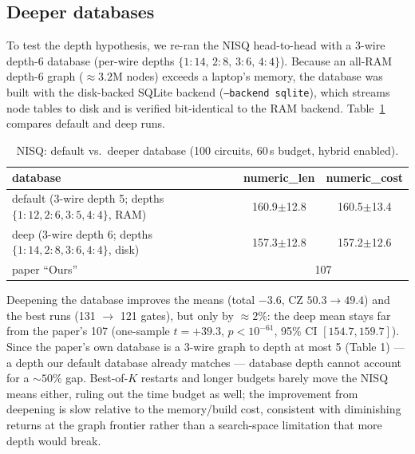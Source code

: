 \documentclass[11pt,a4paper]{article}
\begin{document}
\subsection{Deeper databases}
\label{sec:deep}
To test the depth hypothesis, we re-ran the NISQ head-to-head with a 3-wire
depth-6 database (per-wire depths $\{1{:}14,\,2{:}8,\,3{:}6,\,4{:}4\}$). Because
an all-RAM depth-6 graph ($\approx 3.2$M nodes) exceeds a laptop's memory, the
database was built with the disk-backed SQLite backend
(\texttt{--backend sqlite}), which streams node tables to disk and is verified
bit-identical to the RAM backend. Table~\ref{tab:deep} compares default and
deep runs.

\begin{table}[H]
\centering
\caption{NISQ: default vs.\ deeper database (100 circuits, 60\,s budget,
hybrid enabled).}
\label{tab:deep}
\begin{tabular}{lcc}
\toprule
database & numeric\_len & numeric\_cost \\
\midrule
default (3-wire depth 5; depths $\{1{:}12,2{:}6,3{:}5,4{:}4\}$, RAM) & 160.9$\pm$12.8 & 160.5$\pm$13.4 \\
deep (3-wire depth 6; depths $\{1{:}14,2{:}8,3{:}6,4{:}4\}$, disk) & 157.3$\pm$12.8 & 157.2$\pm$12.6 \\
\midrule
paper ``Ours'' & \multicolumn{2}{c}{107} \\
\bottomrule
\end{tabular}
\end{table}

Deepening the database improves the means (total $-3.6$, CZ $50.3 \to 49.4$)
and the best runs (131 $\to$ 121 gates), but only by $\approx 2\%$: the deep
mean stays far from the paper's 107 (one-sample $t=+39.3$, $p<10^{-61}$, 95\%
CI $[154.7,159.7]$). Since the paper's own database is a 3-wire graph to depth
at most 5 (Table 1) --- a depth our default database already matches ---
database depth cannot account for a $\sim 50\%$ gap. Best-of-$K$ restarts and
longer budgets barely move the NISQ means either, ruling out the time budget
as well; the improvement from deepening is slow relative to the memory/build
cost, consistent with diminishing returns at the graph frontier rather than a
search-space limitation that more depth would break.
\end{document}
